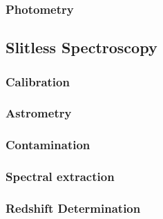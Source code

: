 \documentclass[twocolumn]{aastex63}
\begin{document}
\subsubsection{Photometry}
\label{s:photometry}

\subsection{Slitless Spectroscopy}
\label{s:process_slitless}

\subsubsection{Calibration}
\label{s:slitless_calibration}

\subsubsection{Astrometry}
\label{s:slitless_astrometry}

\subsubsection{Contamination}
\label{s:contamination}

\subsubsection{Spectral extraction}
\label{s:extraction}

\subsubsection{Redshift Determination}
\label{s:redshift}
\end{document}
